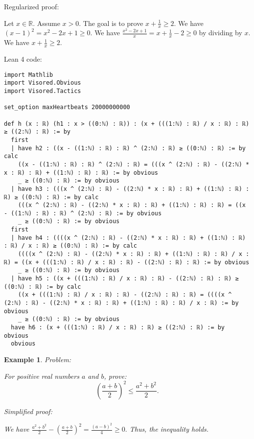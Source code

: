 \documentclass{article}
\newtheorem{example}{Example}
\begin{document}
Regularized proof:
\begin{tcolorbox}[colback=red!10, width=\linewidth]
Let $x\in\mathbb{R}$. Assume $x>0$.
The goal is to prove $x + \frac{1}{x} \ge 2$.
We have ${\left(x-1\right)}^2 = x^2 - 2x + 1 \ge 0$.
We have $\frac{x^2 - 2x + 1}{x} = x + \frac{1}{x} - 2 \ge 0$ by dividing by $x$.
We have $x + \frac{1}{x} \ge 2$.
\end{tcolorbox}

Lean 4 code:
\begin{tcolorbox}[colback=white!10, width=\linewidth]
\begin{lstlisting}[language=Lean4]
import Mathlib
import Visored.Obvious
import Visored.Tactics

set_option maxHeartbeats 20000000000

def h (x : ℝ) (h1 : x > ((0:ℕ) : ℝ)) : (x + (((1:ℕ) : ℝ) / x : ℝ) : ℝ) ≥ ((2:ℕ) : ℝ) := by
  first
  | have h2 : ((x - ((1:ℕ) : ℝ) : ℝ) ^ (2:ℕ) : ℝ) ≥ ((0:ℕ) : ℝ) := by calc
    ((x - ((1:ℕ) : ℝ) : ℝ) ^ (2:ℕ) : ℝ) = (((x ^ (2:ℕ) : ℝ) - ((2:ℕ) * x : ℝ) : ℝ) + ((1:ℕ) : ℝ) : ℝ) := by obvious
    _ ≥ ((0:ℕ) : ℝ) := by obvious
  | have h3 : (((x ^ (2:ℕ) : ℝ) - ((2:ℕ) * x : ℝ) : ℝ) + ((1:ℕ) : ℝ) : ℝ) ≥ ((0:ℕ) : ℝ) := by calc
    (((x ^ (2:ℕ) : ℝ) - ((2:ℕ) * x : ℝ) : ℝ) + ((1:ℕ) : ℝ) : ℝ) = ((x - ((1:ℕ) : ℝ) : ℝ) ^ (2:ℕ) : ℝ) := by obvious
    _ ≥ ((0:ℕ) : ℝ) := by obvious
  first
  | have h4 : ((((x ^ (2:ℕ) : ℝ) - ((2:ℕ) * x : ℝ) : ℝ) + ((1:ℕ) : ℝ) : ℝ) / x : ℝ) ≥ ((0:ℕ) : ℝ) := by calc
    ((((x ^ (2:ℕ) : ℝ) - ((2:ℕ) * x : ℝ) : ℝ) + ((1:ℕ) : ℝ) : ℝ) / x : ℝ) = ((x + (((1:ℕ) : ℝ) / x : ℝ) : ℝ) - ((2:ℕ) : ℝ) : ℝ) := by obvious
    _ ≥ ((0:ℕ) : ℝ) := by obvious
  | have h5 : ((x + (((1:ℕ) : ℝ) / x : ℝ) : ℝ) - ((2:ℕ) : ℝ) : ℝ) ≥ ((0:ℕ) : ℝ) := by calc
    ((x + (((1:ℕ) : ℝ) / x : ℝ) : ℝ) - ((2:ℕ) : ℝ) : ℝ) = ((((x ^ (2:ℕ) : ℝ) - ((2:ℕ) * x : ℝ) : ℝ) + ((1:ℕ) : ℝ) : ℝ) / x : ℝ) := by obvious
    _ ≥ ((0:ℕ) : ℝ) := by obvious
  have h6 : (x + (((1:ℕ) : ℝ) / x : ℝ) : ℝ) ≥ ((2:ℕ) : ℝ) := by obvious
  obvious

\end{lstlisting}
\end{tcolorbox}


\begin{example}
Problem:
\begin{tcolorbox}[colback=yellow!10, width=\linewidth]
For positive real numbers $a$ and $b$, prove:
    $$\left(\frac{a+b}{2}\right)^2 \leq \frac{a^2+b^2}{2}.$$
\end{tcolorbox}

Simplified proof:
\begin{tcolorbox}[colback=blue!10, width=\linewidth]
We have
$ \frac{a^2+b^2}{2} - \left(\frac{a+b}{2}\right)^2 = \frac{(a-b)^2}{4} \ge 0. $
Thus, the inequality holds.
\end{tcolorbox}
\end{example}
\end{document}
